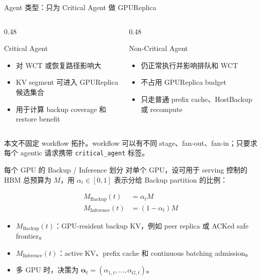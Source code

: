 \documentclass[aspectratio=43]{beamer}
\newcommand{\tightitems}{\setlength{\itemsep}{2pt}\setlength{\parskip}{0pt}}
\begin{document}
\begin{frame}{Agent 类型：只为 Critical Agent 做 GPUReplica}
  \small
  \begin{columns}[T,onlytextwidth]
    \begin{column}{0.48\textwidth}
      \begin{block}{Critical Agent}
        \begin{itemize}
          \tightitems
          \item 对 WCT 或恢复路径影响大
          \item KV segment 可进入 GPUReplica 候选集合
          \item 用于计算 backup coverage 和 restore benefit
        \end{itemize}
      \end{block}
    \end{column}
    \begin{column}{0.48\textwidth}
      \begin{block}{Non-Critical Agent}
        \begin{itemize}
          \tightitems
          \item 仍正常执行并影响排队和 WCT
          \item 不占用 GPUReplica budget
          \item 只走普通 prefix cache、HostBackup 或 recompute
        \end{itemize}
      \end{block}
    \end{column}
  \end{columns}

  \vspace{0.25cm}
  \footnotesize
  本文不固定 workflow 拓扑。workflow 可以有不同 stage、fan-out、fan-in；只要求每个 agentic 请求携带 \texttt{critical\_agent} 标签。
\end{frame}

\begin{frame}{每个 GPU 的 Backup / Inference 划分}
  \small
  对单个 GPU，设可用于 serving 控制的 HBM 总预算为 $M$，用 $\alpha_t \in [0,1]$ 表示分给 Backup partition 的比例：

  \vspace{0.2cm}
  \begin{align*}
    M_{\mathrm{Backup}}(t) &= \alpha_t M \\
    M_{\mathrm{Inference}}(t) &= (1 - \alpha_t)M
  \end{align*}

  \begin{itemize}
    \tightitems
    \item $M_{\mathrm{Backup}}(t)$：GPU-resident backup KV，例如 peer replica 或 ACKed safe frontier。
    \item $M_{\mathrm{Inference}}(t)$：active KV、prefix cache 和 continuous batching admission。
    \item 多 GPU 时，决策为 $\boldsymbol{\alpha}_t=(\alpha_{1,t},\ldots,\alpha_{G,t})$。
  \end{itemize}
\end{frame}
\end{document}
